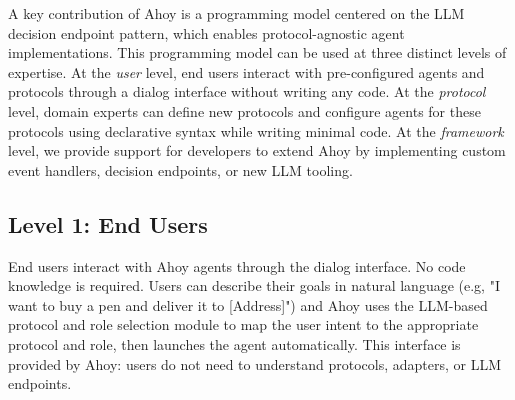 \documentclass[runningheads]{llncs}
\newcounter{akccount}
\DeclareRobustCommand{\akc}[1]{\stepcounter{akccount}\textcolor{red}{\textsf{AKC \theakccount: #1}}}
\newcommand{\ahoy}{Ahoy\xspace}
\begin{document}

A key contribution of \ahoy is a programming model centered on the LLM decision endpoint pattern, which enables protocol-agnostic agent implementations.
This programming model can be used at three distinct levels of expertise.
At the \emph{user} level, end users interact with pre-configured agents and protocols through a dialog interface without writing any code.
At the \emph{protocol} level, domain experts can define new protocols and configure agents for these protocols using declarative syntax while writing minimal code.
At the \emph{framework} level, we provide support for developers to extend \ahoy by implementing custom event handlers, decision endpoints, or new LLM tooling.


\subsection{Level 1: End Users}
End users interact with \ahoy agents through the dialog interface.
No code knowledge is required.
Users can describe their goals in natural language (e.g, "I want to buy a pen and deliver it to [Address]") and \ahoy uses the LLM-based protocol and role selection module to map the user intent to the appropriate protocol and role, then launches the agent automatically.
This interface is provided by \ahoy: users do not need to understand protocols, adapters, or LLM endpoints.
\end{document}
